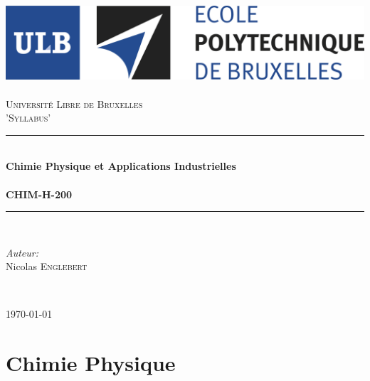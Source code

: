 \documentclass[11pt, a4paper, openany]{book}
\begin{document}
\renewcommand{\proofname}{Démonstration}
\frontmatter
\begin{titlepage}
\begin{center}	
	
	\newcommand{\HRule}{\rule{\linewidth}{0.5mm}}   			%
	\includegraphics[scale=0.11]{logo.jpg}~\\[1cm]				%

	\textsc{\LARGE Université Libre de Bruxelles}\\[1.5cm]
	\textsc{\Large 'Syllabus'}\\[0.5cm]

	\HRule \\[0.4cm]
	{ \huge \bfseries Chimie Physique et Applications Industrielles \\ \ \\ CHIM-H-200 \\[0.4cm] }


	\HRule \\[1.5cm]
		\begin{minipage}{0.4\textwidth}
		\begin{flushleft} \large
		
		\emph{Auteur:}\\
			Nicolas \textsc{Englebert}\\
			\end{flushleft}
			\end{minipage}
			\begin{minipage}{0.4\textwidth}
			\begin{flushright} \large
			\emph{} \\		
			\textsc{}
			\end{flushright}
		\end{minipage}

	\vfill

{\large \today}

\end{center}
\end{titlepage}



\tableofcontents

\mainmatter
\part{Chimie Physique}
\end{document}
